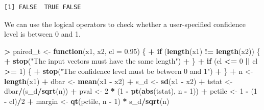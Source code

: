 \documentclass[]{krantz}
\makeatletter
\newenvironment{Shaded}{\begin{snugshade}}{\end{snugshade}}
\newcommand{\ControlFlowTok}[1]{\textcolor[rgb]{0.27,0.27,0.27}{\textbf{#1}}}
\newcommand{\DataTypeTok}[1]{\textcolor[rgb]{0.27,0.27,0.27}{#1}}
\newcommand{\DecValTok}[1]{\textcolor[rgb]{0.06,0.06,0.06}{#1}}
\newcommand{\FloatTok}[1]{\textcolor[rgb]{0.06,0.06,0.06}{#1}}
\newcommand{\KeywordTok}[1]{\textcolor[rgb]{0.27,0.27,0.27}{\textbf{#1}}}
\newcommand{\NormalTok}[1]{#1}
\newcommand{\OperatorTok}[1]{\textcolor[rgb]{0.43,0.43,0.43}{\textbf{#1}}}
\newcommand{\StringTok}[1]{\textcolor[rgb]{0.5,0.5,0.5}{#1}}
\newenvironment{kframe}{%
\medskip{}
\setlength{\fboxsep}{.8em}
 \def\at@end@of@kframe{}%
 \ifinner\ifhmode%
  \def\at@end@of@kframe{\end{minipage}}%
  \begin{minipage}{\columnwidth}%
 \fi\fi%
 \def\FrameCommand##1{\hskip\@totalleftmargin \hskip-\fboxsep
 \colorbox{shadecolor}{##1}\hskip-\fboxsep
     \hskip-\linewidth \hskip-\@totalleftmargin \hskip\columnwidth}%
 \MakeFramed {\advance\hsize-\width
   \@totalleftmargin\z@ \linewidth\hsize
   \@setminipage}}%
 {\par\unskip\endMakeFramed%
 \at@end@of@kframe}
\renewenvironment{Shaded}{\begin{kframe}}{\end{kframe}}
\makeatother
\begin{document}
\begin{verbatim}
[1] FALSE  TRUE FALSE
\end{verbatim}

We can use the logical operators to check whether a user-specified confidence level is between 0 and 1.

\begin{Shaded}
\begin{Highlighting}[]
\OperatorTok{>}\StringTok{ }\NormalTok{paired_t <-}\StringTok{ }\ControlFlowTok{function}\NormalTok{(x1, x2, }\DataTypeTok{cl =} \FloatTok{0.95}\NormalTok{) \{}
\OperatorTok{+}\StringTok{   }\ControlFlowTok{if}\NormalTok{ (}\KeywordTok{length}\NormalTok{(x1) }\OperatorTok{!=}\StringTok{ }\KeywordTok{length}\NormalTok{(x2)) \{}
\OperatorTok{+}\StringTok{     }\KeywordTok{stop}\NormalTok{(}\StringTok{"The input vectors  must have the same length"}\NormalTok{)}
\OperatorTok{+}\StringTok{   }\NormalTok{\}}
\OperatorTok{+}\StringTok{   }\ControlFlowTok{if}\NormalTok{ (cl }\OperatorTok{<=}\StringTok{ }\DecValTok{0} \OperatorTok{||}\StringTok{ }\NormalTok{cl }\OperatorTok{>=}\StringTok{ }\DecValTok{1}\NormalTok{) \{}
\OperatorTok{+}\StringTok{     }\KeywordTok{stop}\NormalTok{(}\StringTok{"The confidence level must be between 0 and 1"}\NormalTok{)}
\OperatorTok{+}\StringTok{   }\NormalTok{\}}
\OperatorTok{+}\StringTok{   }\NormalTok{n <-}\StringTok{ }\KeywordTok{length}\NormalTok{(x1)}
\OperatorTok{+}\StringTok{   }\NormalTok{dbar <-}\StringTok{ }\KeywordTok{mean}\NormalTok{(x1 }\OperatorTok{-}\StringTok{ }\NormalTok{x2)}
\OperatorTok{+}\StringTok{   }\NormalTok{s_d <-}\StringTok{ }\KeywordTok{sd}\NormalTok{(x1 }\OperatorTok{-}\StringTok{ }\NormalTok{x2)}
\OperatorTok{+}\StringTok{   }\NormalTok{tstat <-}\StringTok{ }\NormalTok{dbar}\OperatorTok{/}\NormalTok{(s_d}\OperatorTok{/}\KeywordTok{sqrt}\NormalTok{(n))}
\OperatorTok{+}\StringTok{   }\NormalTok{pval <-}\StringTok{ }\DecValTok{2} \OperatorTok{*}\StringTok{ }\NormalTok{(}\DecValTok{1} \OperatorTok{-}\StringTok{ }\KeywordTok{pt}\NormalTok{(}\KeywordTok{abs}\NormalTok{(tstat), n }\OperatorTok{-}\StringTok{ }\DecValTok{1}\NormalTok{))}
\OperatorTok{+}\StringTok{   }\NormalTok{pctile <-}\StringTok{ }\DecValTok{1} \OperatorTok{-}\StringTok{ }\NormalTok{(}\DecValTok{1} \OperatorTok{-}\StringTok{ }\NormalTok{cl)}\OperatorTok{/}\DecValTok{2}
\OperatorTok{+}\StringTok{   }\NormalTok{margin <-}\StringTok{ }\KeywordTok{qt}\NormalTok{(pctile, n }\OperatorTok{-}\StringTok{ }\DecValTok{1}\NormalTok{) }\OperatorTok{*}\StringTok{ }\NormalTok{s_d}\OperatorTok{/}\KeywordTok{sqrt}\NormalTok{(n)}

\end{Highlighting}
\end{Shaded}
\end{document}
